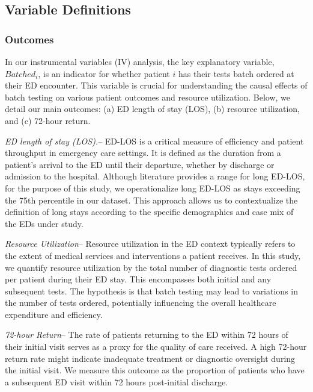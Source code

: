 \documentclass[,,nonblindrev]{informs}
\begin{document}
\hypertarget{variable-definitions}{%
\subsection{Variable Definitions}\label{variable-definitions}}

\hypertarget{outcomes}{%
\subsubsection{Outcomes}\label{outcomes}}

In our instrumental variables (IV) analysis, the key explanatory
variable, \(Batched_i\), is an indicator for whether patient \(i\) has
their tests batch ordered at their ED encounter. This variable is
crucial for understanding the causal effects of batch testing on various
patient outcomes and resource utilization. Below, we detail our main
outcomes: (a) ED length of stay (LOS), (b) resource utilization, and (c)
72-hour return.

\emph{ED length of stay (LOS).}-- ED-LOS is a critical measure of
efficiency and patient throughput in emergency care settings. It is
defined as the duration from a patient's arrival to the ED until their
departure, whether by discharge or admission to the hospital. Although
literature provides a range for long ED-LOS, for the purpose of this
study, we operationalize long ED-LOS as stays exceeding the 75th
percentile in our dataset. This approach allows us to contextualize the
definition of long stays according to the specific demographics and case
mix of the EDs under study.

\emph{Resource Utilization}-- Resource utilization in the ED context
typically refers to the extent of medical services and interventions a
patient receives. In this study, we quantify resource utilization by the
total number of diagnostic tests ordered per patient during their ED
stay. This encompasses both initial and any subsequent tests. The
hypothesis is that batch testing may lead to variations in the number of
tests ordered, potentially influencing the overall healthcare
expenditure and efficiency.

\emph{72-hour Return}-- The rate of patients returning to the ED within
72 hours of their initial visit serves as a proxy for the quality of
care received. A high 72-hour return rate might indicate inadequate
treatment or diagnostic oversight during the initial visit. We measure
this outcome as the proportion of patients who have a subsequent ED
visit within 72 hours post-initial discharge.
\end{document}
